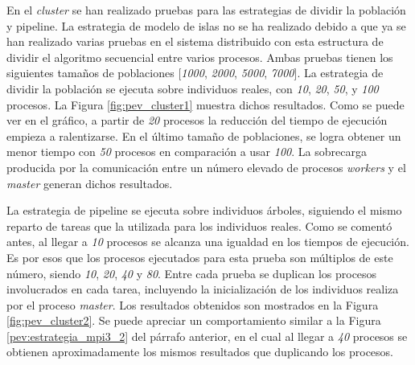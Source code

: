 	
	
	
		En el \textit{cluster} se han realizado pruebas para las estrategias de dividir la población y pipeline. La estrategia de modelo de islas no se ha realizado debido a que ya se han realizado varias pruebas en el sistema distribuido con esta estructura de dividir el algoritmo secuencial entre varios procesos. Ambas pruebas tienen los siguientes tamaños de poblaciones [\textit{1000}, \textit{2000}, \textit{5000}, \textit{7000}]. La estrategia de dividir la población se ejecuta sobre individuos reales, con \textit{10}, \textit{20}, \textit{50}, y \textit{100} procesos. La Figura \ref{fig:pev_cluster1} muestra dichos resultados. Como se puede ver en el gráfico, a partir de \textit{20} procesos la reducción del tiempo de ejecución empieza a ralentizarse. En el último tamaño de poblaciones, se logra obtener un menor tiempo con \textit{50} procesos en comparación a usar \textit{100}. La sobrecarga producida por la comunicación entre un número elevado de procesos \textit{workers} y el \textit{master} generan dichos resultados.
		
		La estrategia de pipeline se ejecuta sobre individuos árboles, siguiendo el mismo reparto de tareas que la utilizada para los individuos reales. Como se comentó antes, al llegar a \textit{10} procesos se alcanza una igualdad en los tiempos de ejecución. Es por esos que los procesos ejecutados para esta prueba son múltiplos de este número, siendo \textit{10}, \textit{20}, \textit{40} y \textit{80}. Entre cada prueba se duplican los procesos involucrados en cada tarea, incluyendo la inicialización de los individuos realiza por el proceso \textit{master}. Los resultados obtenidos son mostrados en la Figura \ref{fig:pev_cluster2}. Se puede apreciar un comportamiento similar a la Figura \ref{pev:estrategia_mpi3_2} del párrafo anterior, en el cual al llegar a \textit{40} procesos se obtienen aproximadamente los mismos resultados que duplicando los procesos.
	
	
	
